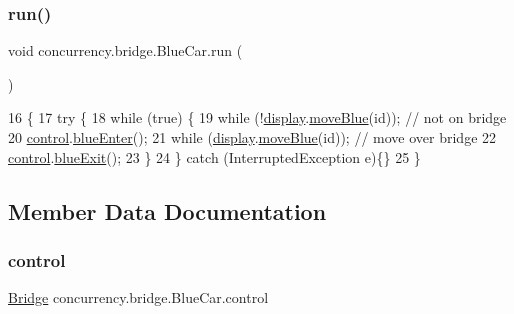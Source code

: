 \subsubsection{\texorpdfstring{run()}{run()}}
{\footnotesize\ttfamily void concurrency.\+bridge.\+Blue\+Car.\+run (\begin{DoxyParamCaption}{ }\end{DoxyParamCaption})\hspace{0.3cm}{\ttfamily [inline]}}


\begin{DoxyCode}
16                       \{
17       \textcolor{keywordflow}{try} \{
18         \textcolor{keywordflow}{while} (\textcolor{keyword}{true}) \{
19             \textcolor{keywordflow}{while} (!\mbox{\hyperlink{classconcurrency_1_1bridge_1_1_blue_car_ae92ab1f7f39265be8271d7b7affdc5e2}{display}}.\mbox{\hyperlink{classconcurrency_1_1bridge_1_1_bridge_canvas_aef8d7c1ca31663c9ba3ec0fdebfc4b73}{moveBlue}}(\textcolor{keywordtype}{id}));  \textcolor{comment}{// not on bridge}
20             \mbox{\hyperlink{classconcurrency_1_1bridge_1_1_blue_car_aabbbdb924664b29e7a682e55862112aa}{control}}.\mbox{\hyperlink{classconcurrency_1_1bridge_1_1_bridge_aec49c327212e021acf464cdd1fc3e7e4}{blueEnter}}();
21             \textcolor{keywordflow}{while} (\mbox{\hyperlink{classconcurrency_1_1bridge_1_1_blue_car_ae92ab1f7f39265be8271d7b7affdc5e2}{display}}.\mbox{\hyperlink{classconcurrency_1_1bridge_1_1_bridge_canvas_aef8d7c1ca31663c9ba3ec0fdebfc4b73}{moveBlue}}(\textcolor{keywordtype}{id}));   \textcolor{comment}{// move over bridge}
22             \mbox{\hyperlink{classconcurrency_1_1bridge_1_1_blue_car_aabbbdb924664b29e7a682e55862112aa}{control}}.\mbox{\hyperlink{classconcurrency_1_1bridge_1_1_bridge_a7b2b68541d7c5f8843e442260b469e8e}{blueExit}}();
23          \}
24       \} \textcolor{keywordflow}{catch} (InterruptedException e)\{\}
25     \}
\end{DoxyCode}


\subsection{Member Data Documentation}
\mbox{\label{classconcurrency_1_1bridge_1_1_blue_car_aabbbdb924664b29e7a682e55862112aa}} 
\subsubsection{\texorpdfstring{control}{control}}
{\footnotesize\ttfamily \mbox{\hyperlink{classconcurrency_1_1bridge_1_1_bridge}{Bridge}} concurrency.\+bridge.\+Blue\+Car.\+control\hspace{0.3cm}{\ttfamily [package]}}

